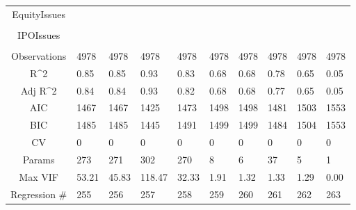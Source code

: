 \documentclass{article}
\begin{document}
\begin{table}[H]
\begin{tabular}{|clllllllll|}
  EquityIssues &  &  &  &  &  &  &  &  &  \\ 
   &  &  &  &  &  &  &  &  &  \\ 
  IPOIssues &  &  &  &  &  &  &  &  &  \\ 
   &  &  &  &  &  &  &  &  &  \\ 
  \hline 
 Observations & 4978 & 4978 & 4978 & 4978 & 4978 & 4978 & 4978 & 4978 & 4978 \\ 
  R^2 & 0.85 & 0.85 & 0.93 & 0.83 & 0.68 & 0.68 & 0.78 & 0.65 & 0.05 \\ 
  Adj R^2 & 0.84 & 0.84 & 0.93 & 0.82 & 0.68 & 0.68 & 0.77 & 0.65 & 0.05 \\ 
  AIC & 1467 & 1467 & 1425 & 1473 & 1498 & 1498 & 1481 & 1503 & 1553 \\ 
  BIC & 1485 & 1485 & 1445 & 1491 & 1499 & 1499 & 1484 & 1504 & 1553 \\ 
  CV & 0 & 0 & 0 & 0 & 0 & 0 & 0 & 0 & 0 \\ 
  Params & 273 & 271 & 302 & 270 & 8 & 6 & 37 & 5 & 1 \\ 
  Max VIF & 53.21 & 45.83 & 118.47 & 32.33 & 1.91 & 1.32 & 1.33 & 1.29 & 0.00 \\ 
  Regression \# & 255 & 256 & 257 & 258 & 259 & 260 & 261 & 262 & 263 \\ 
   \hline
\end{tabular}
 
\end{table}
\end{document}
